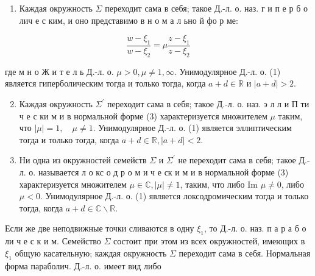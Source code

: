 \documentclass[10pt]{article}
\begin{document}
\begin{enumerate}

  \item Каждая окружность $\Sigma$ переходит сама в себя; такое Д.-л. о. наз. г и п е р б о лич е с ким, и оно представимо в н о м а л ьно й фо р ме:

\end{enumerate}



\[

\frac{w-\xi_{1}}{w-\xi_{2}}=\mu \frac{z-\xi_{1}}{z-\xi_{2}}

\]



где м н о Ж и т е л ь Д.-л. о. $\mu>0, \mu \neq 1, \infty$. Унимодулярное Д.-л. о. (1) является гиперболическим тогда и только тогда, когда $a+d \in \mathbb{R}$ и $|a+d|>2$.



\begin{enumerate}

  \setcounter{enumi}{1}

  \item Каждая окружность $\Sigma^{\prime}$ переходит сама в себя; такое Д.-л. о. наз. э л л и П ти ч е с ки м и в нормальной форме (3) характеризуется множителем $\mu$ таким, что $|\mu|=1, \quad \mu \neq 1$. Унимодулярное Д.-л. о. (1) является эллиптическим тогда и только тогда, когда $a+d \in \mathbb{R},|a+d|<2$.



  \item Ни одна из окружностей семейств $\Sigma$ и $\Sigma^{\prime}$ не переходит сама в себя; такое Д.-л. о. называется л о кс о д р о м и ч е ск и м и в нормальной форме (3) характеризуется множителем $\mu \in \mathbb{C},|\mu| \neq 1$, таким, что либо Im $\mu \neq 0$, либо $\mu<0$. Унимодулярное Д.-л. о. (1) является локсодромическим тогда и только тогда, когда $a+d \in \mathbb{C} \backslash \mathbb{R}$.



\end{enumerate}



Если же две неподвижные точки сливаются в одну $\xi_{1}$, то Д.-л. о. наз. п а р а б о ли ч е с к и м. Семейство $\Sigma$ состоит при этом из всех окружностей, имеющих в $\xi_{1}$ общую касательную; каждая окружность $\Sigma$ переходит сама в себя. Нормальная форма параболич. Д.-л. о. имеет вид либо
\end{document}
